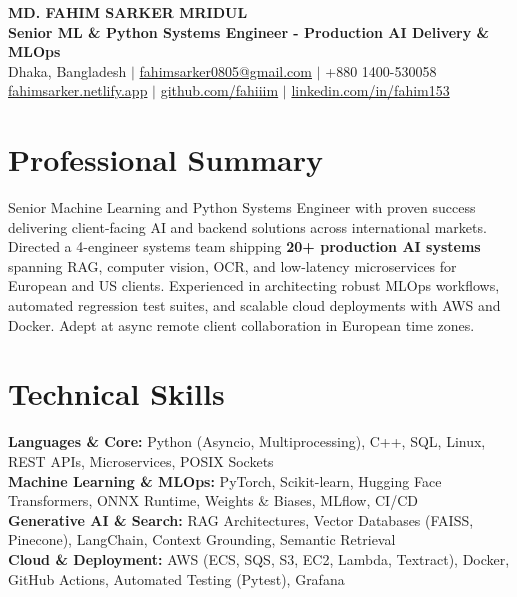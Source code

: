 \documentclass[9.5pt,a4paper]{article}
\begin{document}
{\centering
    {\Large \textbf{MD. FAHIM SARKER MRIDUL}}\\[1pt]
    \textbf{Senior ML \& Python Systems Engineer - Production AI Delivery \& MLOps}\\[1pt]
    Dhaka, Bangladesh \;$\vert$\; \href{mailto:fahimsarker0805@gmail.com}{fahimsarker0805@gmail.com} \;$\vert$\; +880 1400-530058\\[1pt]
    \href{https://fahimsarker.netlify.app}{fahimsarker.netlify.app} \;$\vert$\; \href{https://github.com/fahiiim}{github.com/fahiiim} \;$\vert$\; \href{https://linkedin.com/in/fahim153}{linkedin.com/in/fahim153}\par
}

\vspace{-2.5pt}
\section*{Professional Summary}
Senior Machine Learning and Python Systems Engineer with proven success delivering client-facing AI and backend solutions across international markets. Directed a 4-engineer systems team shipping \textbf{20+ production AI systems} spanning RAG, computer vision, OCR, and low-latency microservices for European and US clients. Experienced in architecting robust MLOps workflows, automated regression test suites, and scalable cloud deployments with AWS and Docker. Adept at async remote client collaboration in European time zones.

\section*{Technical Skills}
\noindent
\textbf{Languages \& Core:} Python (Asyncio, Multiprocessing), C++, SQL, Linux, REST APIs, Microservices, POSIX Sockets\\
\textbf{Machine Learning \& MLOps:} PyTorch, Scikit-learn, Hugging Face Transformers, ONNX Runtime, Weights \& Biases, MLflow, CI/CD\\
\textbf{Generative AI \& Search:} RAG Architectures, Vector Databases (FAISS, Pinecone), LangChain, Context Grounding, Semantic Retrieval\\
\textbf{Cloud \& Deployment:} AWS (ECS, SQS, S3, EC2, Lambda, Textract), Docker, GitHub Actions, Automated Testing (Pytest), Grafana
\end{document}
